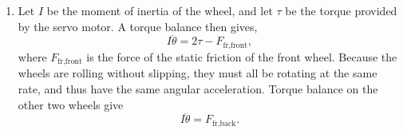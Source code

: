 \documentclass{article}
\numberwithin{equation}{section}
\begin{document}
\begin{enumerate}[label=\textbf{1.\arabic*}]
    
    \item Let $I$ be the moment of inertia of the wheel, and let $\tau$ be the torque provided by the servo motor. A torque balance then gives,
    \begin{equation}
        I\ddot{\theta} = 2\tau - F_\text{fr,front}, 
    \end{equation}
    where $F_\text{fr,front}$ is the force of the static friction of the front wheel. Because the wheels are rolling without slipping, they must all be rotating at the same rate, and thus have the same angular acceleration. Torque balance on the other two wheels give 
    \begin{equation}
        I\ddot{\theta} = F_\text{fr,back}.
    \end{equation}

\end{enumerate}
\end{document}
